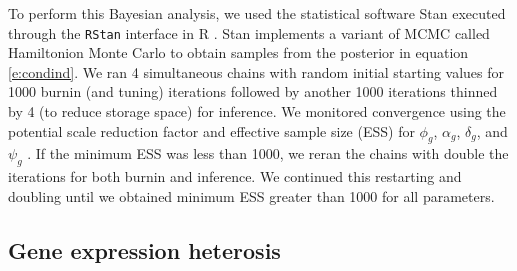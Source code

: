 \documentclass[useAMS,usenatbib,referee]{biom}
\newcommand{\Stan}{Stan}
\newcommand{\RStan}{{\tt RStan}}
\begin{document}
To perform this Bayesian analysis, we used the statistical software \Stan{} \citep{stan-software:2014} executed through the \RStan{} interface \citep{rstan-software:2014} in R \citep{R2014}. \Stan{} implements a variant of MCMC called Hamiltonion Monte Carlo \citep{neal2011mcmc} to obtain samples from the posterior in equation \eqref{e:condind}. We ran 4 simultaneous chains with random initial starting values for 1000 burnin (and tuning) iterations followed by another 1000 iterations thinned by 4 (to reduce storage space) for inference. We monitored convergence using the potential scale reduction factor and effective sample size (ESS) for $\phi_g$, $\alpha_g$, $\delta_g$, and $\psi_g$ \citep{Gelm:Rubi:infe:1992}. If the minimum ESS was less than 1000, we reran the chains with double the iterations for both burnin and inference. We continued this restarting and doubling until we obtained minimum ESS greater than 1000 for all parameters.

\subsection{Gene expression heterosis}
\label{s:gene_heterosis}
\end{document}
